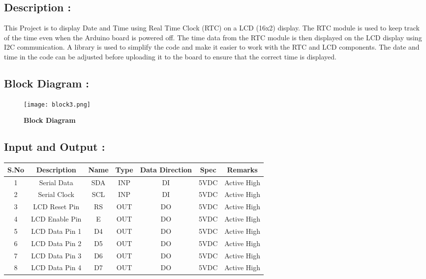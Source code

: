 \documentclass[12pt]{article}
\begin{document}
\subsection*{\textbf{Description :}}
 This Project is to display Date and Time using Real Time Clock (RTC) on a LCD (16x2) display. The RTC module is used to keep track of the time even when the Arduino board is powered off. The time data from the RTC module is then displayed on the LCD display using I2C communication. A library is used to simplify the code and make it easier to work with the RTC and LCD components. The date and time in the code can be adjusted before uploading it to the board to ensure that the correct time is displayed.
 
 \subsection*{\textbf{Block Diagram :}}
 
  \begin{figure}[h]
\centering
\texttt{[image: block3.png]}
\caption{\textbf{Block Diagram}}
\label{block_diagram1}
\end{figure} 
 
 \subsection*{\textbf{Input and Output :}}
 
   \begin{tabular}{|c|c|c|c|c|c|c|}
  \hline
 \textbf{S.No }& \textbf{Description} & \textbf{Name}&\textbf{Type }& \textbf{Data Direction}  &\textbf{ Spec}& \textbf{Remarks} \\
  \hline
  1 &Serial Data &SDA & INP  & DI  &5VDC&Active High \\
  \hline
  2 &Serial Clock &SCL&INP  & DI  &5VDC&Active High \\
  \hline
  3 &LCD Reset Pin & RS &OUT &DO&5VDC&Active High \\
  \hline
  4 &LCD Enable Pin & E &OUT &DO &5VDC&Active High \\
  \hline
  5&LCD Data Pin 1 & D4 &OUT &DO &5VDC&Active High \\
  \hline
  6 & LCD Data Pin 2& D5 &OUT & DO &5VDC&Active High \\
 \hline
  7 & LCD Data Pin 3 & D6 &OUT & DO &5VDC&Active High \\
  \hline
  8 &LCD Data Pin 4 & D7 &OUT& DO &5VDC&Active High \\
  \hline
\end{tabular}
 
\end{document}
